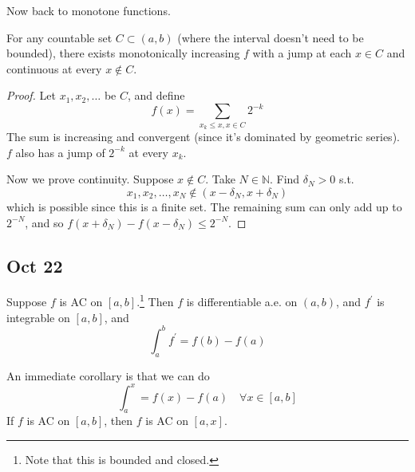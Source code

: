   Now back to monotone functions. 

  \begin{theorem}
    For any countable set $C \subset (a, b)$ (where the interval doesn't need to be bounded), there exists monotonically increasing $f$ with a jump at each $x \in C$ and continuous at every $x \not\in C$. 
  \end{theorem}
  \begin{proof}
    Let $x_1, x_2, \ldots$ be $C$, and define 
    \begin{equation}
      f(x) = \sum_{x_k \leq x, x \in C} 2^{-k}
    \end{equation}
    The sum is increasing and convergent (since it's dominated by geometric series). $f$ also has a jump of $2^{-k}$ at every $x_k$. 

    Now we prove continuity. Suppose $x \not\in C$. Take $N \in \mathbb{N}$. Find $\delta_N > 0$ s.t. 
    \begin{equation}
      x_1, x_2, \ldots, x_N \not\in (x - \delta_N, x + \delta_N)
    \end{equation}
    which is possible since this is a finite set. The remaining sum can only add up to $2^{-N}$, and so $f(x + \delta_N) - f(x - \delta_N) \leq 2^{-N}$. 
  \end{proof}


\subsection{Oct 22} 

  \begin{theorem}
    Suppose $f$ is AC on $[a, b]$.\footnote{Note that this is bounded and closed.} Then $f$ is differentiable a.e. on $(a, b)$, and $f^\prime$ is integrable on $[a, b]$, and 
    \begin{equation}
      \int_a^b f^\prime = f(b) - f(a)
    \end{equation}
  \end{theorem}

  An immediate corollary is that we can do 
  \begin{equation}
    \int_a^x = f(x) - f(a) \quad \forall x \in [a, b]
  \end{equation}
  If $f$ is AC on $[a, b]$, then $f$ is AC on $[a, x]$.  

